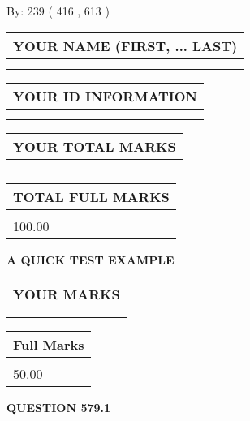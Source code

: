 \documentclass[12pt]{article}
\begin{document}
   
\hspace{1.0in} By: 
 239 ( 416 ,  613 )
   
   
   
   
\newpage 
\setcounter{page}{ 
   579001 } 
   
   
   
   
\noindent\begin{tabular}{|l|}
\hline
YOUR NAME (FIRST, ... LAST)  \\
\hline
 \\ 
 \\ 
\hline
\end{tabular}
\hspace{0.05in} \begin{tabular}{|l|}
\hline
 YOUR   ID   INFORMATION  \\
\hline
 \\ 
 \\ 
\hline
\end{tabular}
   
   
\vspace{0.2in}\noindent\begin{tabular}{|l|}
\hline
YOUR TOTAL MARKS  \\
\hline
 \\ 
 \\ 
\hline
\end{tabular}
\hspace{0.05in} \begin{tabular}{|l|}
\hline
TOTAL FULL MARKS  \\
\hline
 \\ 
100.00 \\
\hline
\end{tabular}
   
   
 \vspace{0.2in}
{\LARGE {\textbf{ A QUICK TEST EXAMPLE}}}
   
   
  
\vspace{0.2in}
  
\noindent\begin{tabular}{|l|}
\hline
 YOUR MARKS  \\
\hline
 \\ 
 \\ 
\hline
\end{tabular}
\hspace{0.05in} \begin{tabular}{|l|}
\hline
 Full Marks  \\
\hline
 \\ 
50.00 \\
\hline
\end{tabular}
{\textbf{\Large{QUESTION
579.1 
}}}
  
\end{document}

